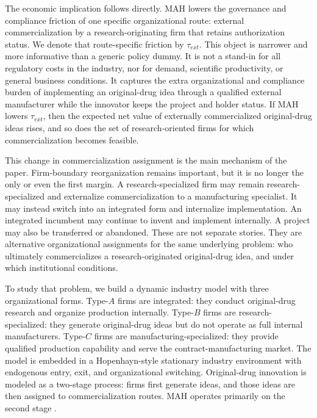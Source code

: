 The economic implication follows directly. MAH lowers the governance and compliance friction of one specific organizational route: external commercialization by a research-originating firm that retains authorization status. We denote that route-specific friction by $\tau_{ext}$. This object is narrower and more informative than a generic policy dummy. It is not a stand-in for all regulatory costs in the industry, nor for demand, scientific productivity, or general business conditions. It captures the extra organizational and compliance burden of implementing an original-drug idea through a qualified external manufacturer while the innovator keeps the project and holder status. If MAH lowers $\tau_{ext}$, then the expected net value of externally commercialized original-drug ideas rises, and so does the set of research-oriented firms for which commercialization becomes feasible.

This change in commercialization assignment is the main mechanism of the paper. Firm-boundary reorganization remains important, but it is no longer the only or even the first margin. A research-specialized firm may remain research-specialized and externalize commercialization to a manufacturing specialist. It may instead switch into an integrated form and internalize implementation. An integrated incumbent may continue to invent and implement internally. A project may also be transferred or abandoned. These are not separate stories. They are alternative organizational assignments for the same underlying problem: who ultimately commercializes a research-originated original-drug idea, and under which institutional conditions.

To study that problem, we build a dynamic industry model with three organizational forms. Type-$A$ firms are integrated: they conduct original-drug research and organize production internally. Type-$B$ firms are research-specialized: they generate original-drug ideas but do not operate as full internal manufacturers. Type-$C$ firms are manufacturing-specialized: they provide qualified production capability and serve the contract-manufacturing market. The model is embedded in a Hopenhayn-style stationary industry environment with endogenous entry, exit, and organizational switching. Original-drug innovation is modeled as a two-stage process: firms first generate ideas, and those ideas are then assigned to commercialization routes. MAH operates primarily on the second stage \cite{Hopenhayn1992,EricsonPakes1995,KletteKortum2004,AkcigitKerr2018,FonsRosenRoldanBlancoSchmitz2024}.

